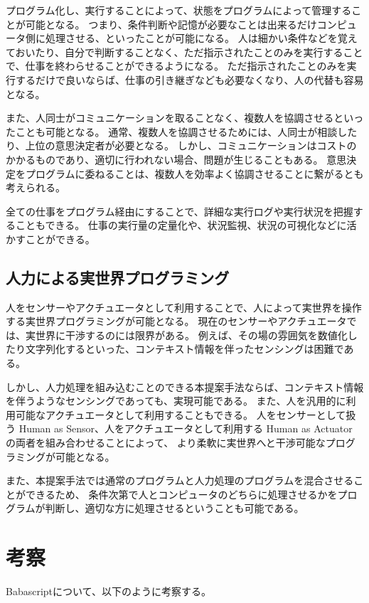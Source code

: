 \documentclass[twoside]{wiss}
\begin{document}
プログラム化し、実行することによって、状態をプログラムによって管理することが可能となる。
つまり、条件判断や記憶が必要なことは出来るだけコンピュータ側に処理させる、といったことが可能になる。
人は細かい条件などを覚えておいたり、自分で判断することなく、ただ指示されたことのみを実行することで、仕事を終わらせることができるようになる。
ただ指示されたことのみを実行するだけで良いならば、仕事の引き継ぎなども必要なくなり、人の代替も容易となる。

また、人同士がコミュニケーションを取ることなく、複数人を協調させるといったことも可能となる。
通常、複数人を協調させるためには、人同士が相談したり、上位の意思決定者が必要となる。
しかし、コミュニケーションはコストのかかるものであり、適切に行われない場合、問題が生じることもある。
意思決定をプログラムに委ねることは、複数人を効率よく協調させることに繋がるとも考えられる。

全ての仕事をプログラム経由にすることで、詳細な実行ログや実行状況を把握することもできる。
仕事の実行量の定量化や、状況監視、状況の可視化などに活かすことができる。

\subsection{人力による実世界プログラミング}

人をセンサーやアクチュエータとして利用することで、人によって実世界を操作する実世界プログラミングが可能となる。
現在のセンサーやアクチュエータでは、実世界に干渉するのには限界がある。
例えば、その場の雰囲気を数値化したり文字列化するといった、コンテキスト情報を伴ったセンシングは困難である。

しかし、人力処理を組み込むことのできる本提案手法ならば、コンテキスト情報を伴うようなセンシングであっても、実現可能である。
また、人を汎用的に利用可能なアクチュエータとして利用することもできる。
人をセンサーとして扱う Human as Sensor、人をアクチュエータとして利用する Human as Actuator の両者を組み合わせることによって、
より柔軟に実世界へと干渉可能なプログラミングが可能となる。

また、本提案手法では通常のプログラムと人力処理のプログラムを混合させることができるため、
条件次第で人とコンピュータのどちらに処理させるかをプログラムが判断し、適切な方に処理させるということも可能である。

\section{考察}

Babascriptについて、以下のように考察する。
\end{document}
